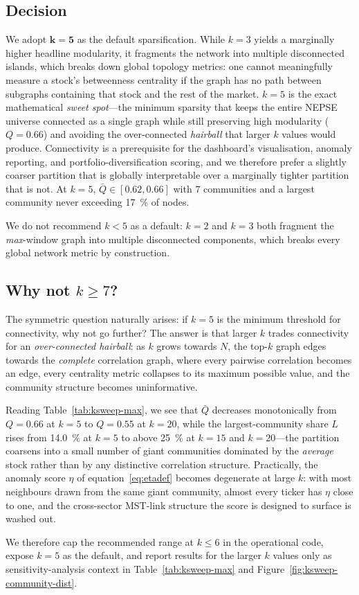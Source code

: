 \subsection{Decision}
\label{sec:ksweep-decision}

We adopt $\bm{k=5}$ as the default sparsification.  While $k=3$ yields
a marginally higher headline modularity, it fragments the network into
multiple disconnected islands, which breaks down global topology
metrics: one cannot meaningfully measure a stock's betweenness
centrality if the graph has no path between subgraphs containing that
stock and the rest of the market.  $k=5$ is the exact mathematical
\emph{sweet spot}---the minimum sparsity that keeps the entire NEPSE
universe connected as a single graph while still preserving high
modularity ($Q=0.66$) and avoiding the over-connected \emph{hairball}
that larger $k$ values would produce.  Connectivity is a prerequisite
for the dashboard's visualisation, anomaly reporting, and
portfolio-diversification scoring, and we therefore prefer a slightly
coarser partition that is globally interpretable over a marginally
tighter partition that is not.  At $k=5$, $\bar Q\in[0.62, 0.66]$ with
$7$ communities and a largest community never exceeding
\SI{17}{\percent} of nodes.

We do not recommend $k<5$ as a default: $k=2$ and $k=3$ both fragment
the \emph{max}-window graph into multiple disconnected components,
which breaks every global network metric by construction.

\subsection{Why not $k\ge 7$?}
\label{sec:ksweep-not7}

The symmetric question naturally arises: if $k=5$ is the minimum
threshold for connectivity, why not go further?  The answer is that
larger $k$ trades connectivity for an \emph{over-connected hairball}:
as $k$ grows towards $N$, the top-$k$ graph edges towards the
\emph{complete} correlation graph, where every pairwise correlation
becomes an edge, every centrality metric collapses to its maximum
possible value, and the community structure becomes uninformative.

Reading Table~\ref{tab:ksweep-max}, we see that $\bar Q$ decreases
monotonically from $Q=0.66$ at $k=5$ to $Q=0.55$ at $k=20$, while the
largest-community share $L$ rises from \SI{14.0}{\percent} at $k=5$ to
above \SI{25}{\percent} at $k=15$ and $k=20$---the partition coarsens
into a small number of giant communities dominated by the
\emph{average} stock rather than by any distinctive correlation
structure.  Practically, the anomaly score $\eta$ of
equation~\eqref{eq:etadef} becomes degenerate at large $k$: with most
neighbours drawn from the same giant community, almost every ticker
has $\eta$ close to one, and the cross-sector MST-link structure the
score is designed to surface is washed out.

We therefore cap the recommended range at $k\le 6$ in the
operational code, expose $k=5$ as the default, and report results for
the larger $k$ values only as sensitivity-analysis context in
Table~\ref{tab:ksweep-max} and
Figure~\ref{fig:ksweep-community-dist}.

\newpage
